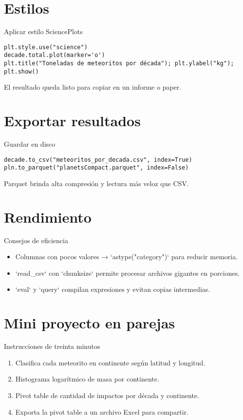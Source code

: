 \documentclass[10pt]{beamer}
\begin{document}
\section{Estilos}
\begin{frame}[fragile]{Aplicar estilo SciencePlots}
\begin{verbatim}
plt.style.use("science")
decade.total.plot(marker='o')
plt.title("Toneladas de meteoritos por década"); plt.ylabel("kg"); plt.show()
\end{verbatim}
El resultado queda listo para copiar en un informe o paper.
\end{frame}

\section{Exportar resultados}
\begin{frame}[fragile]{Guardar en disco}
\begin{verbatim}
decade.to_csv("meteoritos_por_decada.csv", index=True)
pln.to_parquet("planetsCompact.parquet", index=False)
\end{verbatim}
Parquet brinda alta compresión y lectura más veloz que CSV.
\end{frame}

\section{Rendimiento}
\begin{frame}{Consejos de eficiencia}
\begin{itemize}
  \item Columnas con pocos valores → `astype("category")` para reducir memoria.  
  \item `read\_csv` con `chunksize` permite procesar archivos gigantes en porciones.  
  \item `eval` y `query` compilan expresiones y evitan copias intermedias.
\end{itemize}
\end{frame}

\section{Mini proyecto en parejas}
\begin{frame}{Instrucciones de treinta minutos}
\begin{enumerate}
  \item Clasifica cada meteorito en continente según latitud y longitud.  
  \item Histograma logarítmico de masa por continente.  
  \item Pivot table de cantidad de impactos por década y continente.  
  \item Exporta la pivot table a un archivo Excel para compartir.
\end{enumerate}
\end{frame}
\end{document}

